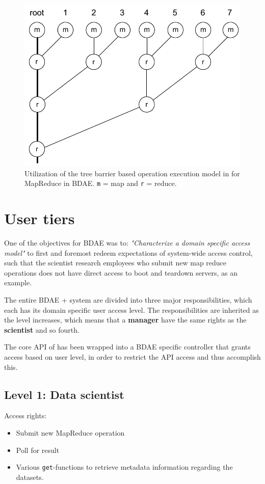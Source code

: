 \begin{figure}
	\centering
	\includegraphics[scale=0.7]{pdf/map-reduce-tree.pdf}
	\caption[BDAE MapReduce implementation]{Utilization of the tree barrier based operation execution model in \CodeName for MapReduce in BDAE. \texttt{m} = map and \texttt{r} = reduce. \label{fig:map-reduce-tree}}
\end{figure}	

\section{User tiers} \label{sec:user-tiers}
One of the objectives for BDAE was to: \textit{"Characterize a domain specific access model"} to first and foremost redeem expectations of system-wide access control, such that the scientist research employees who submit new map reduce operations does not have direct access to boot and teardown servers, as an example.
\newline

The entire BDAE + \CodeName system are divided into three major responsibilities, which each has its domain specific user access level. The responsibilities are inherited as the level increases, which means that a \textbf{manager} have the same rights as the \textbf{scientist} and so fourth.
\newline

The core API of \CodeName has been wrapped into a BDAE specific controller that grants access based on user level, in order to restrict the API access and thus accomplish this.

\subsection{Level 1: Data scientist}
Access rights:
\begin{itemize}
	\item Submit new MapReduce operation
	\item Poll for result
	\item Various \texttt{get}-functions to retrieve metadata information regarding the datasets.
\end{itemize}


